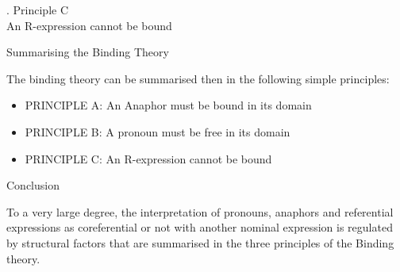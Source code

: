 \begin{frame}
  \ex.
Principle C\\
An R-expression cannot be bound


\end{frame}


\begin{frame}
  {Summarising the Binding Theory}

The binding theory can be summarised then in the following simple principles:

\begin{itemize}
\item[]PRINCIPLE A: An Anaphor must be bound in its domain
\item[]PRINCIPLE B: A pronoun must be free in its domain
\item[]PRINCIPLE C: An R-expression cannot be bound
\end{itemize}
\end{frame}

\begin{frame}
  {Conclusion}

To a very large degree, the interpretation of pronouns, anaphors and referential expressions as coreferential or not with another nominal expression is regulated by structural factors that are summarised in the three principles of the Binding theory.


\end{frame}






